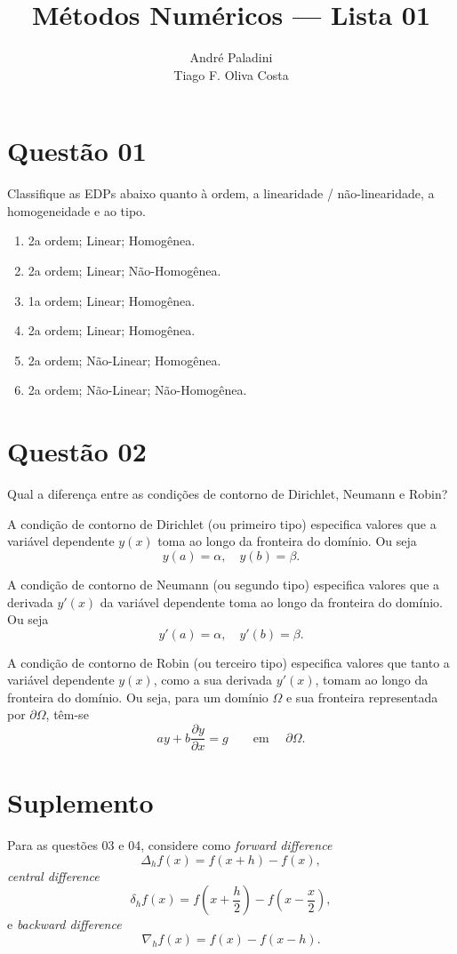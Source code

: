 \documentclass{article}
\title{Métodos Numéricos --- Lista 01}
\author{André Paladini  \quad 14182390 \\ Tiago F. Oliva Costa \quad 8004408 }
\begin{document}
\maketitle

\section{Questão 01}
Classifique as EDPs abaixo quanto à ordem, a linearidade / não-linearidade, a homogeneidade e ao tipo.

\begin{enumerate}[label=\Alph*]
\item 2a ordem; Linear; Homogênea.
\item 2a ordem; Linear; Não-Homogênea.
\item 1a ordem; Linear; Homogênea.
\item 2a ordem; Linear; Homogênea.
\item 2a ordem; Não-Linear; Homogênea.
\item 2a ordem; Não-Linear; Não-Homogênea.
\end{enumerate}

\section{Questão 02}
Qual a diferença entre as condições de contorno de Dirichlet, Neumann e Robin?

A condição de contorno de Dirichlet (ou primeiro tipo) especifica valores que a variável dependente $y(x)$ toma ao longo da fronteira do domínio. Ou seja
\[ y(a) = \alpha, \quad y(b) = \beta. \]

A condição de contorno de Neumann (ou segundo tipo) especifica valores que a derivada $y'(x)$ da variável dependente  toma ao longo da fronteira do domínio. Ou seja
\[ y'(a) = \alpha, \quad y'(b) = \beta. \]

A condição de contorno de Robin (ou terceiro tipo) especifica valores que tanto a variável dependente $y(x)$, como a sua derivada $y'(x)$, tomam ao longo da fronteira do domínio. Ou seja, para um domínio $\Omega$ e sua fronteira representada por $\partial \Omega$, têm-se
\[ a y + b \frac{\partial y}{\partial x} =g \qquad \text{em } \quad \partial \Omega.\]

\section{Suplemento}
Para as questões 03 e 04, considere como \emph{forward difference}
\[
	\Delta_h f(x) = f(x+h) - f(x),
\]
\emph{central difference}
\[
	\delta_h f(x) = f(x+\frac{h}{2}) - f(x - \frac{x}{2}),
\]
e \emph{backward difference}
\[
	\nabla_h f(x) = f(x) - f(x-h).
\]
\end{document}
